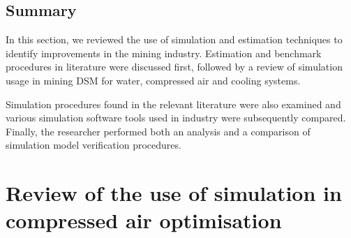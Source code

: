 	\subsection{Summary}
 	In this section, we reviewed the use of simulation and estimation techniques to identify improvements in the mining industry. Estimation and benchmark procedures in literature were discussed first, followed by a review of simulation usage in mining DSM for water, compressed air and cooling systems.
 	
 	Simulation procedures found in the relevant literature were also examined and various simulation software tools used in industry were subsequently compared. Finally, the researcher performed both an analysis and a comparison of simulation model verification procedures.
 	\clearpage
\section{Review of the use of simulation in compressed air optimisation}
\label{CompressorSimulation Literature} \label{simplfiedModels}
